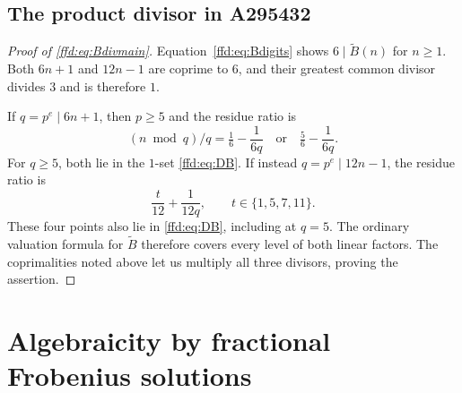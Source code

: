 \documentclass[11pt]{article}
\theoremstyle{definition}
\theoremstyle{remark}
\newcommand{\tB}{\widetilde B}
\begin{document}
\subsection{The product divisor in A295432}\label{ffd:sec:a295432}
\begin{proof}[Proof of \eqref{ffd:eq:Bdivmain}]
Equation~\eqref{ffd:eq:Bdigits} shows $6\mid \tB(n)$ for $n\ge1$.
Both $6n+1$ and $12n-1$ are coprime to $6$, and their greatest common divisor
divides $3$ and is therefore $1$.

If $q=p^e\mid6n+1$, then $p\ge5$ and the residue ratio is
\[
 (n\bmod q)/q=\tfrac16-\frac1{6q}\quad\text{or}\quad
 \tfrac56-\frac1{6q}.
\]
For $q\ge5$, both lie in the $1$-set \eqref{ffd:eq:DB}. If instead
$q=p^e\mid12n-1$, the residue ratio is
\[
 \frac{t}{12}+\frac1{12q},\qquad t\in\{1,5,7,11\}.
\]
These four points also lie in \eqref{ffd:eq:DB}, including at $q=5$.
The ordinary valuation formula for $\tB$ therefore covers every level of both
linear factors. The coprimalities noted above let us multiply all three
divisors, proving the assertion.
\end{proof}

\section{Algebraicity by fractional Frobenius solutions}\label{ffd:sec:monodromy}
\end{document}
